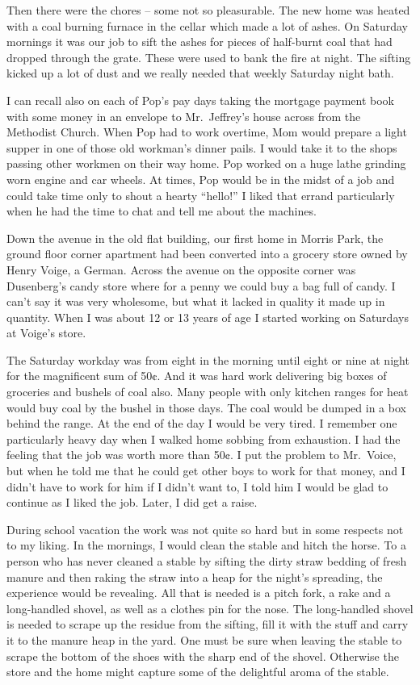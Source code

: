 \documentclass[12pt]{book}              %
\begin{document}
Then there were the chores -- some not so pleasurable. The new home was heated with a coal burning furnace in the cellar which made a lot of ashes. On Saturday mornings it was our job to sift the ashes for pieces of half-burnt coal that had dropped through the grate. These were used to bank the fire at night. The sifting kicked up a lot of dust and we really needed that weekly Saturday night bath.

I can recall also on each of Pop's pay days taking the mortgage payment book with some money in an envelope to Mr.~Jeffrey's house across from the Methodist Church. When Pop had to work overtime, Mom would prepare a light supper in one of those old workman's dinner pails. I would take it to the shops passing other workmen on their way home. Pop worked on a huge lathe grinding worn engine and car wheels. At times, Pop would be in the midst of a job and could take time only to shout a hearty ``hello!'' I liked that errand particularly when he had the time to chat and tell me about the machines. 

Down the avenue in the old flat building, our first home in Morris Park, the ground floor corner apartment had been converted into a grocery store owned by Henry Voige, a German. Across the avenue on the opposite corner was Dusenberg's candy store where for a penny we could buy a bag full of candy. I can't say it was very wholesome, but what it lacked in quality it made up in quantity. When I was about 12 or 13 years of age I started working on Saturdays at Voige's store.

The Saturday workday was from eight in the morning until eight or nine at night for the magnificent sum of 50$\cent$. And it was hard work delivering big boxes of groceries and bushels of coal also. Many people with only kitchen ranges for heat would buy coal by the bushel in those days. The coal would be dumped in a box behind the range. At the end of the day I would be very tired. I remember one particularly heavy day when I walked home sobbing from exhaustion. I had the feeling that the job was worth more than 50$\cent$. I put the problem to Mr.~Voice, but when he told me that he could get other boys to work for that money, and I didn't have to work for him if I didn't want to, I told him I would be glad to continue as I liked the job. Later, I did get a raise. 

During school vacation the work was not quite so hard but in some respects not to my liking. In the mornings, I would clean the stable and hitch the horse. To a person who has never cleaned a stable by sifting the dirty straw bedding of fresh manure and then raking the straw into a heap for the night's spreading, the experience would be revealing. All that is needed is a pitch fork, a rake and a long-handled shovel, as well as a clothes pin for the nose. The long-handled shovel is needed to scrape up the residue from the sifting, fill it with the stuff and carry it to the manure heap in the yard. One must be sure when leaving the stable to scrape the bottom of the shoes with the sharp end of the shovel. Otherwise the store and the home might capture some of the delightful aroma of the stable. 
\end{document}
